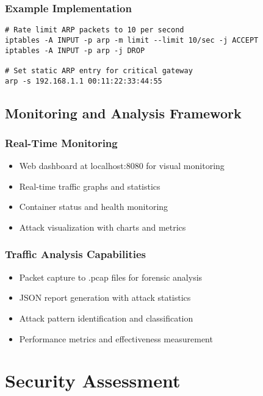 \documentclass[12pt,a4paper]{article}
\begin{document}
\subsubsection{Example Implementation}
\begin{lstlisting}[caption=Linux ARP Rate Limiting Implementation]
# Rate limit ARP packets to 10 per second
iptables -A INPUT -p arp -m limit --limit 10/sec -j ACCEPT
iptables -A INPUT -p arp -j DROP

# Set static ARP entry for critical gateway
arp -s 192.168.1.1 00:11:22:33:44:55
\end{lstlisting}

\subsection{Monitoring and Analysis Framework}

\subsubsection{Real-Time Monitoring}
\begin{itemize}
    \item Web dashboard at localhost:8080 for visual monitoring
    \item Real-time traffic graphs and statistics
    \item Container status and health monitoring
    \item Attack visualization with charts and metrics
\end{itemize}

\subsubsection{Traffic Analysis Capabilities}
\begin{itemize}
    \item Packet capture to .pcap files for forensic analysis
    \item JSON report generation with attack statistics
    \item Attack pattern identification and classification
    \item Performance metrics and effectiveness measurement
\end{itemize}

\section{Security Assessment}
\end{document}
